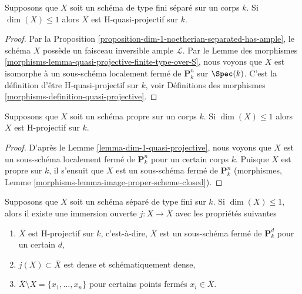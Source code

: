 \begin{lemma}
\label{lemma-dim-1-quasi-projective}
Supposons que $X$ soit un schéma de type fini séparé sur un corps
$k$. Si $\dim(X) \leq 1$ alors $X$ est H-quasi-projectif sur $k$.
\end{lemma}

\begin{proof}
Par la Proposition
\ref{proposition-dim-1-noetherian-separated-has-ample}, le schéma $X$
possède un faisceau inversible ample $\mathcal{L}$. Par le Lemme des
morphismes \ref{morphisms-lemma-quasi-projective-finite-type-over-S}, nous
voyons que $X$ est isomorphe à un sous-schéma localement fermé de
$\mathbf{P}^n_k$ sur $\Spec(k)$. C'est la définition d'être H-quasi-projectif sur
$k$, voir Définitions des morphismes \ref{morphisms-definition-quasi-projective}.
\end{proof}

\begin{lemma}
\label{lemma-dim-1-proper-projective}
Supposons que $X$ soit un schéma propre sur un corps
$k$. Si $\dim(X) \leq 1$ alors $X$ est H-projectif sur $k$.
\end{lemma}

\begin{proof}
D'après le Lemme \ref{lemma-dim-1-quasi-projective}, nous voyons
que $X$ est un sous-schéma localement fermé de $\mathbf{P}^n_k$
pour un certain corps $k$. Puisque $X$ est propre sur $k$, il
s'ensuit que $X$ est un sous-schéma fermé de $\mathbf{P}^n_k$
(morphismes, Lemme \ref{morphisms-lemma-image-proper-scheme-closed}).
\end{proof}

\begin{lemma}
\label{lemma-dim-1-projective-completion}
Supposons que $X$ soit un schéma séparé de type fini sur
$k$. Si $\dim(X) \leq 1$, alors il existe une immersion
ouverte $j : X \to \overline{X}$ avec les propriétés suivantes
\begin{enumerate}
\item $\overline{X}$ est H-projectif sur $k$,
c'est-à-dire, $\overline{X}$ est un sous-schéma fermé
de $\mathbf{P}^d_k$ pour un certain $d$, \item $j(X)
\subset \overline{X}$ est dense et schématiquement
dense, \item $\overline{X} \setminus X = \{x_1, \ldots,
x_n\}$ pour certains points fermés $x_i \in \overline{X}$.
\end{enumerate}
\end{lemma}

